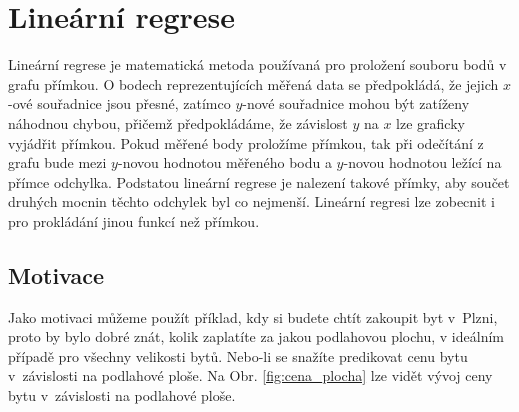 
\section{Lineární regrese}
\label{sec:LinearniRegrese}

\par{Lineární regrese je matematická metoda používaná pro proložení souboru bodů v grafu přímkou. O bodech reprezentujících měřená data se předpokládá, že jejich $x$-ové souřadnice jsou přesné, zatímco $y$-nové souřadnice mohou být zatíženy náhodnou chybou, přičemž předpokládáme, že závislost $y$ na $x$ lze graficky vyjádřit přímkou. Pokud měřené body proložíme přímkou, tak při odečítání z grafu bude mezi $y$-novou hodnotou měřeného bodu a $y$-novou hodnotou ležící na přímce odchylka. Podstatou lineární regrese je nalezení takové přímky, aby součet druhých mocnin těchto odchylek byl co nejmenší. Lineární regresi lze zobecnit i pro prokládání jinou funkcí než přímkou.}










\subsection{Motivace}
\label{sec:LinearniRegreseMotivace}

\par{Jako motivaci můžeme použít příklad, kdy si budete chtít zakoupit byt v~Plzni, proto by bylo dobré znát, kolik zaplatíte za jakou podlahovou plochu, v ideálním případě pro všechny velikosti bytů. Nebo-li se snažíte predikovat cenu bytu v~závislosti na podlahové ploše. Na Obr. \ref{fig:cena_plocha} lze vidět vývoj ceny bytu v~závislosti na podlahové ploše.}

